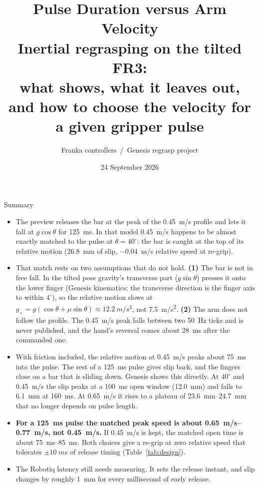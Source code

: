 \documentclass[10.5pt,a4paper]{article}
\title{\textbf{Pulse Duration versus Arm Velocity}\\[2pt]
\large Inertial regrasping on the tilted FR3:\\ what \code{preview\_linear\_vel.py} shows, what it leaves out,\\ and how to choose the velocity for a given gripper pulse}
\author{Franka controllers \,/\, Genesis regrasp project}
\date{24 September 2026}
\newcommand{\gp}{g_{+}}
\begin{document}
\maketitle

\begin{keybox}{Summary}
\begin{itemize}[leftmargin=12pt]
\item The preview releases the bar at the peak of the \SI{0.45}{m/s} profile and lets it fall at $g\cos\theta$ for
\SI{125}{ms}. In that model \SI{0.45}{m/s} happens to be almost exactly matched to the pulse at
$\theta=40^\circ$: the bar is caught at the top of its relative motion (\SI{26.8}{mm} of slip,
\SI{-0.04}{m/s} relative speed at re-grip).
\item That match rests on two assumptions that do not hold. \textbf{(1)} The bar is not in free fall.
In the tilted pose gravity's transverse part ($g\sin\theta$) presses it onto the lower finger (Genesis kinematics:
the transverse direction is the finger axis to within $4^\circ$), so the relative motion slows at
$\gp=g(\cos\theta+\mu\sin\theta)\approx\SI{12.2}{m/s^2}$, not \SI{7.5}{m/s^2}. \textbf{(2)} The arm does not
follow the profile. The \SI{0.45}{m/s} peak falls between two \SI{50}{Hz} ticks and is never published, and the
hand's reversal comes about \SI{28}{ms} after the commanded one.
\item With friction included, the relative motion at \SI{0.45}{m/s} peaks about \SI{75}{ms} into the pulse. The rest
of a \SI{125}{ms} pulse gives slip back, and the fingers close on a bar that is sliding down. Genesis shows
this directly. At $40^\circ$ and \SI{0.45}{m/s} the slip peaks at a \SI{100}{ms} open window (\SI{12.0}{mm}) and
falls to \SI{6.1}{mm} at \SI{160}{ms}. At \SI{0.65}{m/s} it rises to a plateau of \SIrange{23.6}{24.7}{mm} that
no longer depends on pulse length.
\item \textbf{For a \SI{125}{ms} pulse the matched peak speed is about \SIrange{0.65}{0.77}{m/s}, not
\SI{0.45}{m/s}.} If \SI{0.45}{m/s} is kept, the matched open time is about \SIrange{75}{85}{ms}. Both
choices give a re-grip at zero relative speed that tolerates $\pm\SI{10}{ms}$ of release timing
(Table~\ref{tab:design}).
\item The Robotiq latency still needs measuring. It sets the release instant, and slip changes by roughly
\SI{1}{mm} for every millisecond of early release.
\end{itemize}
\end{keybox}
\end{document}
